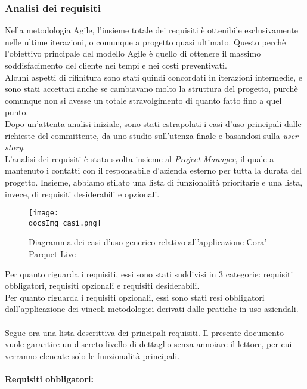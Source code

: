 \subsubsection{Analisi dei requisiti}
Nella metodologia Agile, l'insieme totale dei requisiti \`e ottenibile esclusivamente nelle ultime iterazioni, o comunque a progetto quasi ultimato. Questo perch\`e l'obiettivo principale del modello Agile \`e quello di ottenere il massimo soddisfacimento del cliente nei tempi e nei costi preventivati.\\
Alcuni aspetti di rifinitura sono stati quindi concordati in iterazioni intermedie, e sono stati accettati anche se cambiavano molto la struttura del progetto, purch\`e comunque non si avesse un totale stravolgimento di quanto fatto fino a quel punto.\\
Dopo un'attenta analisi iniziale, sono stati estrapolati i casi d'uso principali dalle richieste del committente, da uno studio sull'utenza finale e basandosi sulla \textit{user story}.\\
L'analisi dei requisiti \`e stata svolta insieme al \textit{Project Manager}, il quale a mantenuto i contatti con il responsabile d'azienda esterno per tutta la durata del progetto. Insieme, abbiamo stilato una lista di funzionalit\`a prioritarie e una lista, invece, di requisiti desiderabili e opzionali.

\begin{figure}[H]
	\centering
	\texttt{[image: \\docsImg casi.png]}
	\caption{Diagramma dei casi d'uso generico relativo all'applicazione Cora' Parquet Live}
	\label{fig:Diagramma dei casi d'uso generico relativo all'applicazione Cora' Parquet Live}
\end{figure}
\noindent
Per quanto riguarda i requisiti, essi sono stati suddivisi in 3 categorie: requisiti obbligatori, requisiti opzionali e requisiti desiderabili.\\
Per quanto riguarda i requisiti opzionali, essi sono stati resi obbligatori dall'applicazione dei vincoli metodologici derivati dalle pratiche in uso aziendali.\\\\
Segue ora una lista descrittiva dei principali requisiti. Il presente documento vuole garantire un discreto livello di dettaglio senza annoiare il lettore, per cui verranno elencate solo le funzionalit\`a principali.\\\\

\textbf{Requisiti obbligatori:}

